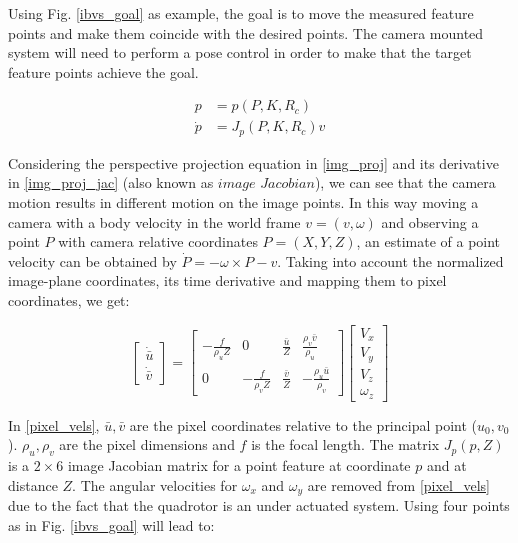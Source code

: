 \documentclass[conference]{IEEEtran}
\begin{document}
Using Fig. \ref{ibvs_goal} as example, the goal is to move the measured feature points and make them coincide with the desired points. The camera mounted system will need to perform a pose control in order to make that the target feature points achieve the goal.

\begin{align}
p & = \textit{p}(P,K,R_{c}) \label{img_proj} \\
\dot{p} & = J_{p}(P,K,R_{c})v \label{img_proj_jac}
\end{align}

Considering the perspective projection equation in \eqref{img_proj} and its derivative in \eqref{img_proj_jac} (also known as $\textit{image Jacobian}$), we can see that the camera motion results in different motion on the image points. In this way moving a camera with a body velocity in the world frame $v=(\textit{v}, \omega)$ and observing a point $P$ with camera relative coordinates $P=(X,Y,Z)$, an estimate of a point velocity can be obtained by $\dot{P} = -\omega \times P - v$. Taking into account the normalized image-plane coordinates, its time derivative and mapping them to pixel coordinates, we get:

\begin{equation}
\begin{bmatrix} \dot{\bar{u}} \\ \dot{\bar{v}} \end{bmatrix}  = \begin{bmatrix} -\frac{f}{\rho_{u}Z} & 0 & \frac{\bar{u}}{Z} & \frac{\rho_{v}\bar{v}}{\rho_{u}} \\ 0 & -\frac{f}{\rho_{v}Z} & \frac{\bar{v}}{Z} & -\frac{\rho_{u}\bar{u}}{\rho_{v}} \end{bmatrix} \begin{bmatrix}  V_{x} \\ V_{y} \\ V_{z} \\ \omega_{z} \end{bmatrix} \label{pixel_vels}
\end{equation} 

In \eqref{pixel_vels}, $\bar{u},\bar{v}$ are the pixel coordinates relative to the principal point ($u_{0},v_{0}$). $\rho_{u}, \rho_{v}$ are the pixel dimensions and $f$ is the focal length. The matrix $J_{p}(p,Z)$ is a $2 \times 6$ image Jacobian matrix for a point feature at coordinate $p$ and at distance $Z$. The angular velocities for $\omega_{x}$ and $\omega_{y}$ are removed from \eqref{pixel_vels} due to the fact that the quadrotor is an under actuated system.
Using four points as in Fig. \ref{ibvs_goal} will lead to:
\end{document}
